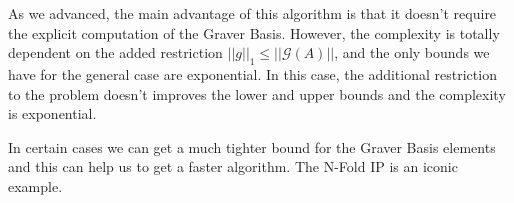 As we advanced, the main advantage of this algorithm is that it doesn't require the explicit computation of the Graver Basis. However, the complexity is totally dependent on the added restriction $||g||_1 \leq ||\mathcal{G}(A)||$, and the only bounds we have for the general case are exponential. In this case, the additional restriction to the problem doesn't improves the lower and upper bounds and the complexity is exponential. 

In certain cases we can get a much tighter bound for the Graver Basis elements and this can help us to get a faster algorithm. The N-Fold IP is an iconic example. 